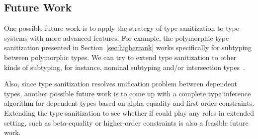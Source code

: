 \subsection{Future Work}

One possible future work is to apply the strategy of type sanitization to type
systems with more advanced features. For example, the polymorphic type
sanitization presented in Section~\ref{sec:higherrank} works specifically for
subtyping between polymorphic types. We can try to extend type sanitization to
other kinds of subtyping, for instance, nominal subtyping and/or intersection
types~\cite{}.

Also, since type sanitization resolves unification problem between dependent
types, another possible future work is to come up with a complete type inference
algorithm for dependent types based on alpha-equality and first-order
constraints. Extending the type sanitization to see whether if could play
any roles in extended setting, such as beta-equality or higher-order constraints
is also a feasible future work.
